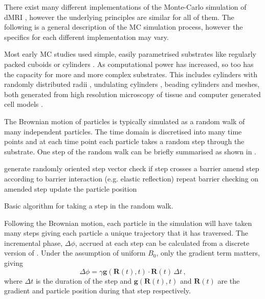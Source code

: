 There exist many different implementations of the Monte-Carlo simulation of \ac{dMRI} \cite{Yeh2013,Nilsson2012,Landman2010,Balls2009,Hall2009,Ford1997,Szafer1995}, however the underlying principles are similar for all of them. The following is a general description of the \ac{MC} simulation process, however the specifics for each different implementation may vary. 



Most early \ac{MC} studies used simple, easily parametrised substrates like regularly packed cuboids \cite{Szafer1995} or cylinders \cite{Ford1997}.
As computational power has increased, so too has the capacity for more and more complex substrates.
This includes cylinders with randomly distributed radii \cite{Hall2009}, undulating  cylinders \cite{Nilsson2012}, beading cylinders \cite{Budde2010} and meshes, both generated from high resolution microscopy of tissue \cite{Panagiotaki2010} and computer generated cell models \cite{Palombo2019,Rafael-Patino2018}.

The Brownian motion of particles is typically simulated as a random walk of many independent particles. The time domain is discretised into many time points and at each time point each particle takes a random step through the substrate.  
One step of the random walk can be briefly summarised as shown in .
\begin{algorithm}
  \begin{algorithmic}
    \State generate randomly oriented step vector
    \State check if step crosses a barrier 
    \State amend step according to barrier interaction (e.g. elastic reflection)
    \State repeat barrier checking on amended step
    \EndWhile
    \State update the particle position 
  \end{algorithmic}
  \caption{Basic algorithm for taking a step in the random walk.}
  \label{alg:MC_random_walk}
\end{algorithm}
 
Following the Brownian motion, each particle in the simulation will have taken many steps giving each particle a unique trajectory that it has traversed.
The incremental phase, $\Delta \phi$, accrued at each step can be calculated from a discrete version of . Under the assumption of uniform $B_0$, only the gradient term matters, giving
\begin{equation}
  \Delta \phi = \gamma \mathbf{g}(\mathbf{R}(t), t) \cdot \mathbf{R}(t)\, \Delta t \,,
  \label{eq:deltaPhi}
\end{equation}
where $\Delta t$ is the duration of the step and $\mathbf{g}(\mathbf{R}(t), t)$ and $\mathbf{R}(t)$ are the gradient and particle position during that step respectively.

